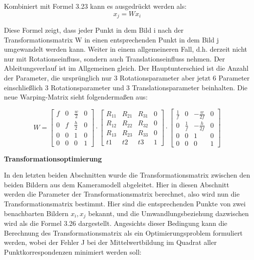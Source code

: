 Kombiniert mit Formel 3.23 kann es ausgedrückt werden als:
\begin{equation}
   x_j = Wx_i
\end{equation}

Diese Formel zeigt, dass jeder Punkt in dem Bild i nach der Transformationsmatrix W in einen entsprechenden Punkt in dem Bild j umgewandelt werden kann. Weiter in einem allgemeineren Fall, d.h. derzeit nicht nur mit Rotationseinfluss, sondern auch Translationseinfluss nehmen. Der Ableitungsverlauf ist im Allgemeinen gleich. Der Hauptunterschied ist die Anzahl der Parameter, die ursprünglich nur 3 Rotationsparameter aber jetzt 6 Parameter einschließlich 3 Rotationsparameter und 3 Translationsparameter beinhalten. Die neue Warping-Matrix sieht folgendermaßen aus:

\begin{equation}
   W = \begin{bmatrix}
	f			& 0 		& \frac{w}{2}	  & 0 \\
	0	 		& f			& \frac{h}{2} 	  & 0 \\
	0     		& 0 		& 1 			  & 0 \\	
	0     		& 0 		& 0 			  & 1
	\end{bmatrix} \cdot \begin{bmatrix}
	R_{11}			& R_{21}  		& R_{31}	  & 0 \\
	R_{12}	 		& R_{22}		& R_{32}	  & 0 \\
	R_{13}     		& R_{23} 		& R_{33} 	  & 0 \\	
	t1     			& t2 			& t3 		  & 1
	\end{bmatrix} \cdot \begin{bmatrix}
	\frac{1}{f}	   & 0 				& -\frac{w}{2f}	  & 0 \\
	0	 		   & \frac{1}{f}	& -\frac{h}{2f}   & 0 \\
	0     		   & 0 		        & 1 			  & 0 \\	
	0     		   & 0 		        & 0 			  & 1
	\end{bmatrix}
\end{equation}

\textbf{Transformationsoptimierung}

In den letzten beiden Abschnitten wurde die Transformationsmatrix zwischen den beiden Bildern aus dem Kameramodell abgeleitet. Hier in diesen Abschnitt werden die Parameter der Transformationsmatrix berechnet, also wird nun die Transformationsmatrix bestimmt. Hier sind die entsprechenden Punkte von zwei benachbarten Bildern $x_i, x_j$ bekannt, und die Umwandlungsbeziehung dazwischen wird als die Formel 3.26 dargestellt. Angesichts dieser Bedingung 
kann die Berechnung des Transformationsmatrix als ein Optimierungsproblem formuliert werden, wobei der Fehler J bei der Mittelwertbildung im Quadrat aller Punktkorrespondenzen minimiert werden soll:

